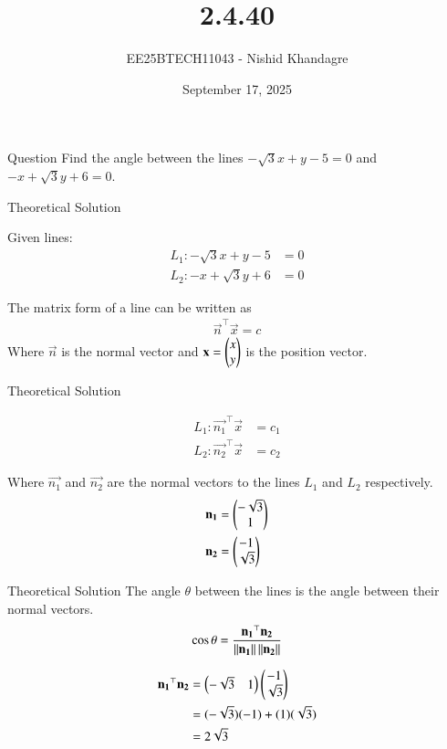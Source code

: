 \documentclass{beamer}
\title
{2.4.40}
\date{September 17, 2025}
\author
{EE25BTECH11043 - Nishid Khandagre}
\begin{document}
\frame{\titlepage}

\begin{frame}{Question}
Find the angle between the lines $-\sqrt{3}x + y - 5 = 0$ and $- x + \sqrt{3}y + 6 = 0$.
\end{frame}

\begin{frame}{Theoretical Solution}

Given lines:
\begin{align}
L_1: -\sqrt{3}x + y - 5 &= 0 \\
L_2: - x + \sqrt{3}y + 6 &= 0
\end{align}

The matrix form of a line can be written as \\ 
\begin{align}
\vec{n}^\top \vec{x} = c
\end{align}
Where $\vec{n}$ is the normal vector and $\mathbf{x} = \begin{pmatrix}x \\ y\end{pmatrix}$ is the position vector.
\end{frame}

\begin{frame}{Theoretical Solution}

\begin{align}
L_1: \vec{n_1}^\top\vec{x}&=c_1\\
L_2: \vec{n_2}^\top\vec{x}&=c_2
\end{align}

Where $\vec{n_1}$ and $\vec{n_2}$ are the normal vectors to the lines $L_1$ and $L_2$ respectively.
\begin{align}
\mathbf{n_1} &= \begin{pmatrix}-\sqrt{3} \\ 1\end{pmatrix} \\
\mathbf{n_2} &= \begin{pmatrix}-1 \\ \sqrt{3}\end{pmatrix}
\end{align}
\end{frame}

\begin{frame}{Theoretical Solution}
The angle $\theta$ between the lines is the angle between their normal vectors.
\begin{align}
\cos \theta = \frac{\mathbf{n_1}^\top \mathbf{n_2}}{\left\lVert\mathbf{n_1}\right\rVert \left\lVert\mathbf{n_2}\right\rVert} \label{eq:equation}
\end{align}

\begin{align}
\mathbf{n_1}^\top \mathbf{n_2} &= \begin{pmatrix} -\sqrt{3} & 1 \end{pmatrix} \begin{pmatrix}-1 \\ \sqrt{3}\end{pmatrix} \\
&= (-\sqrt{3})(-1) + (1)(\sqrt{3}) \\
&= 2\sqrt{3}
\end{align}
\end{frame}
\end{document}
